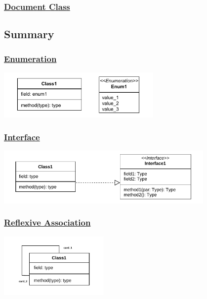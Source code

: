\newpage
\subsubsection*{\underline{Document Class}}


\subsection{Summary}

\subsubsection*{\underline{Enumeration}}
\begin{center}
\includegraphics[width=0.6\textwidth]{Chapters/Diagram/OOP/Sum/Enum/enum.drawio.pdf}
\end{center}

\subsubsection*{\underline{Interface}}
\begin{center}
\includegraphics[width=0.8\textwidth]{Chapters/Diagram/OOP/Sum/Inter/inte.drawio.pdf}
\end{center}

\subsubsection*{\underline{Reflexive Association}}
\begin{center}
    \includegraphics[width=0.4\textwidth]{Chapters/Diagram/OOP/Sum/reflexiveAssoc/selfassoc.drawio.pdf}
\end{center}


